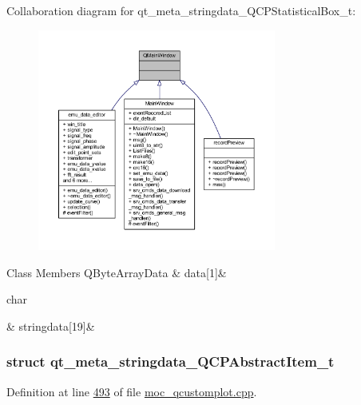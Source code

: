 Collaboration diagram for qt\+\_\+meta\+\_\+stringdata\+\_\+\+Q\+C\+P\+Statistical\+Box\+\_\+t\+:
\nopagebreak
\begin{figure}[H]
\begin{center}
\leavevmode
\includegraphics[width=222pt]{d4/d5b/a00294}
\end{center}
\end{figure}
\begin{DoxyFields}{Class Members}
\hypertarget{a00067_a5e26535af2751ed72a5c0a296eff07f6}{Q\+Byte\+Array\+Data}\label{a00067_a5e26535af2751ed72a5c0a296eff07f6}
&
data\mbox{[}1\mbox{]}&
\\
\hline

\hypertarget{a00067_a69ea5a8754685d08ddf21f3f6478bb52}{char}\label{a00067_a69ea5a8754685d08ddf21f3f6478bb52}
&
stringdata\mbox{[}19\mbox{]}&
\\
\hline

\end{DoxyFields}
\label{d7/d6e/a00190}
\hypertarget{a00067_d7/d6e/a00190}{}
\subsubsection{struct qt\+\_\+meta\+\_\+stringdata\+\_\+\+Q\+C\+P\+Abstract\+Item\+\_\+t}


Definition at line \hyperlink{a00067_source_l00493}{493} of file \hyperlink{a00067_source}{moc\+\_\+qcustomplot.\+cpp}.



